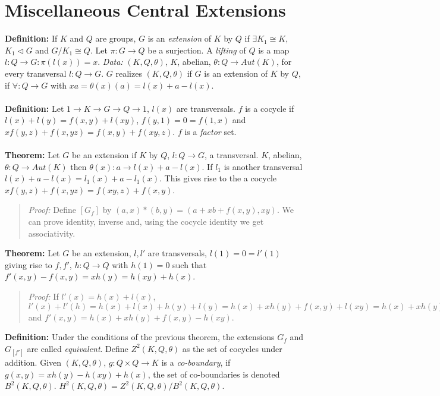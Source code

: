 \section {Miscellaneous Central Extensions}
{\bf Definition:} If $K$ and $Q$ are groups, $G$ is an \emph{extension} of $K$ by $Q$ if $\exists K_1 \cong K$,
$K_1 \lhd G$ and $G/K_1 \cong Q$.  Let $\pi: G \rightarrow Q$ be a surjection. A \emph{lifting}
of $Q$ is a map $l:Q \rightarrow G: \pi(l(x))=x$.
\emph{Data:} $(K,Q,\theta)$, $K$, abelian, $\theta: Q \rightarrow Aut(K)$, for every transversal $l: Q \rightarrow G$.
$G$ realizes $(K,Q,\theta)$ if $G$ is an extension of $K$ by $Q$, if $\forall: Q \rightarrow G$ with
$xa=\theta(x)(a)= l(x) + a -l(x)$.
\\
\\
{\bf Definition:} Let $1 \rightarrow K \rightarrow G \rightarrow Q \rightarrow 1$, $l(x)$ are
transversals. $f$ is a cocycle if $l(x) + l(y) = f(x, y) +l(xy)$, $f(y,1) = 0 = f(1,x)$ and
$xf(y,z)+f(x,yz) = f(x,y)+f(xy,z)$. $f$ is a \emph{factor} set.
\\
\\
{\bf Theorem:} Let $G$ be an extension if $K$ by $Q$, $l:Q \rightarrow G$, a transversal.  $K$, abelian,
$\theta:Q \rightarrow Aut(K)$ then $\theta(x): a \rightarrow l(x) + a - l(x)$.  If $l_1$ is another
transversal $l(x) + a - l(x) = l_1(x) + a - l_1(x)$.  This gives rise to the a cocycle
$xf(y,z) + f(x, yz) = f(xy,z) + f(x,y)$.
\begin{quote}
\emph{Proof:}
Define $[G_f]$ by $(a,x)*(b,y) = (a + xb + f(x,y), xy)$.  We can prove identity, inverse and, using the cocycle
identity we get associativity.
\end{quote}
{\bf Theorem:} Let $G$ be an extension, $l, l'$ are transversals, $l(1)=0=l'(1)$ giving rise
to $f, f'$, $h:Q \rightarrow Q$ with $h(1)=0$ such that $f'(x,y) - f(x,y) = xh(y) = h(xy) +h(x)$.
\begin{quote}
\emph{Proof:} If $l'(x)= h(x) + l(x)$,
$l'(x) + l'(h) = h(x) + l(x) + h(y) + l(y) = h(x) +xh(y) + f(x,y) + l(xy) = h(x) + xh(y)+f(x,y) -h(xy) +l'(xy)$
and $f'(x,y) = h(x) +xh(y) +f(x,y) -h(xy)$.
\end{quote}
{\bf Definition:} Under the conditions of the previous theorem, the extensions $G_{f}$ and $G_[f']$ are called
\emph{equivalent}.  Define $Z^2(K, Q, \theta)$ as the set of cocycles under addition.  Given
$(K,Q,\theta)$, $g: Q \times Q \rightarrow K$ is a \emph{co-boundary}, if $g(x,y) =xh(y)-h(xy)+h(x)$,
the set of co-boundaries is denoted $B^2(K,Q, \theta)$.  $H^2(K, Q, \theta) = Z^2(K, Q, \theta) / B^2(K,Q, \theta)$.
